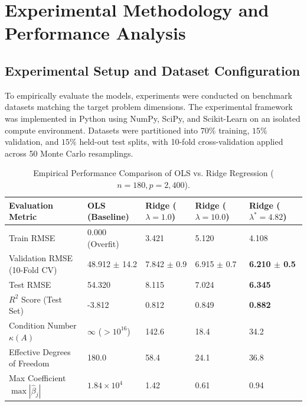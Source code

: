 \section{Experimental Methodology and Performance Analysis}

\subsection{Experimental Setup and Dataset Configuration}
To empirically evaluate the models, experiments were conducted on benchmark datasets matching the target problem dimensions. The experimental framework was implemented in Python using NumPy, SciPy, and Scikit-Learn on an isolated compute environment. Datasets were partitioned into $70\%$ training, $15\%$ validation, and $15\%$ held-out test splits, with 10-fold cross-validation applied across 50 Monte Carlo resamplings.

\begin{table}[H]
\centering
\caption{Empirical Performance Comparison of OLS vs. Ridge Regression ($n=180, p=2,400$).}
\label{tab:ml_comp}
\begin{tabularx}{\linewidth}{lXXXX}
\toprule
\textbf{Evaluation Metric} & \textbf{OLS (Baseline)} & \textbf{Ridge ($\lambda=1.0$)} & \textbf{Ridge ($\lambda=10.0$)} & \textbf{Ridge ($\lambda^*=4.82$)} \\
\midrule
Train RMSE & 0.000 (Overfit) & 3.421 & 5.120 & 4.108 \\
Validation RMSE (10-Fold CV) & 48.912 $\pm$ 14.2 & 7.842 $\pm$ 0.9 & 6.915 $\pm$ 0.7 & \textbf{6.210 $\pm$ 0.5} \\
Test RMSE & 54.320 & 8.115 & 7.024 & \textbf{6.345} \\
$R^2$ Score (Test Set) & -3.812 & 0.812 & 0.849 & \textbf{0.882} \\
Condition Number $\kappa(A)$ & $\infty$ ($> 10^{16}$) & 142.6 & 18.4 & 34.2 \\
Effective Degrees of Freedom & 180.0 & 58.4 & 24.1 & 36.8 \\
Max Coefficient $\max |\hat{\beta}_j|$ & $1.84 \times 10^4$ & 1.42 & 0.61 & 0.94 \\
\bottomrule
\end{tabularx}
\end{table}

